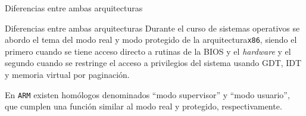 \begin{frame}{Diferencias entre ambas arquitecturas}
	\centering
\end{frame}

\begin{frame}{Diferencias entre ambas arquitecturas}
	Durante el curso de sistemas operativos se abordo el tema del modo real y modo protegido de la arquitectura\texttt{x86}, siendo el primero cuando se tiene acceso directo a rutinas de la BIOS y el \textit{hardware} y el segundo cuando se restringe el acceso a privilegios del sistema usando GDT, IDT y memoria virtual por paginación.
	
	En \texttt{ARM} existen homólogos denominados ``modo supervisor'' y ``modo usuario'', que cumplen una función similar al modo real y protegido, respectivamente.
\end{frame}


